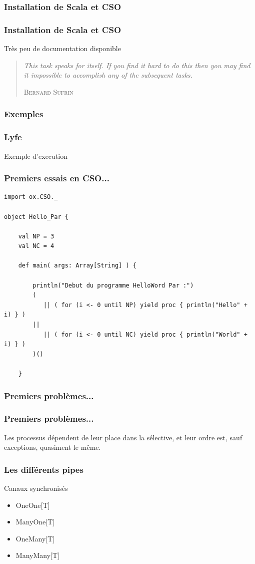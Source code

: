 \documentclass[slidetop,11pt]{beamer}
\begin{document}
\subsubsection{Installation de Scala et CSO}
\begin{frame} 
\frametitle{Installation de Scala et CSO}
Très peu de documentation disponible
\pause
\begin{quotation}
\textit{\og This task speaks for itself. If you find it hard to do this then you may find it impossible
to accomplish any of the subsequent tasks.\fg}
\begin{flushright}
\textsc{Bernard Sufrin}
\end{flushright}
\end{quotation}
\end{frame}

\subsubsection{Exemples}
\begin{frame} 
\frametitle{Lyfe}
Exemple d'execution
\end{frame}

\begin{frame}[containsverbatim]
\frametitle{Premiers essais en CSO...}
\begin{lstlisting}
import ox.CSO._

object Hello_Par {

    val NP = 3
    val NC = 4
    
    def main( args: Array[String] ) {
  
        println("Debut du programme HelloWord Par :")
        ( 
           || ( for (i <- 0 until NP) yield proc { println("Hello" + i) } )
        || 
           || ( for (i <- 0 until NC) yield proc { println("World" + i) } )
        )()
        
    }
\end{lstlisting}
\end{frame}

\subsubsection{Premiers problèmes...}
\begin{frame} 
\frametitle{Premiers problèmes...}
Les processus dépendent de leur place dans la sélective, et leur
ordre est, sauf exceptions, quasiment le même.
\end{frame}


\begin{frame} 
\frametitle{Les différents pipes}
\begin{block}{Canaux synchronisés}
\begin{itemize}[<+->]
\item \textsf{OneOne[T]} 
\item \textsf{ManyOne[T]} 
\item \textsf{OneMany[T]} 
\item \textsf{ManyMany[T]} 
\end{itemize}
\end{block}
\end{frame}
\end{document}
